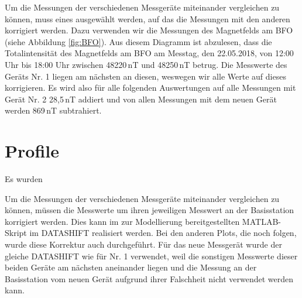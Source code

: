 Um die Messungen der verschiedenen Messgeräte miteinander vergleichen zu können, muss eines ausgewählt werden, auf das die Messungen mit den anderen korrigiert werden. Dazu verwenden wir die Messungen des Magnetfelds am BFO (siehe Abbildung \ref{fig:BFO}). Aus diesem Diagramm ist abzulesen, dass die Totalintensität des Magnetfelds am BFO am Messtag, den 22.05.2018, von 12:00 Uhr bis 18:00 Uhr zwischen 48220\,nT und 48250\,nT betrug. Die Messwerte des Geräts Nr. 1 liegen am nächsten an diesen, weswegen wir alle Werte auf dieses korrigieren. Es wird also für alle folgenden Auswertungen auf alle Messungen mit Gerät Nr. 2  28,5\,nT addiert und von allen Messungen mit dem neuen Gerät werden 869\,nT subtrahiert.

\section{Profile}

Es wurden 


Um die Messungen der verschiedenen Messgeräte miteinander vergleichen zu können, müssen die Messwerte um ihren jeweiligen Messwert an der Basisstation korrigiert werden. Dies kann im zur Modellierung bereitgestellten MATLAB-Skript im DATASHIFT realisiert werden. Bei den anderen Plots, die noch folgen, wurde diese Korrektur auch durchgeführt. Für das neue Messgerät wurde der gleiche DATASHIFT wie für Nr. 1 verwendet, weil die sonstigen Messwerte dieser beiden Geräte am nächsten aneinander liegen und die Messung an der Basisstation vom neuen Gerät aufgrund ihrer Falschheit nicht verwendet werden kann.


